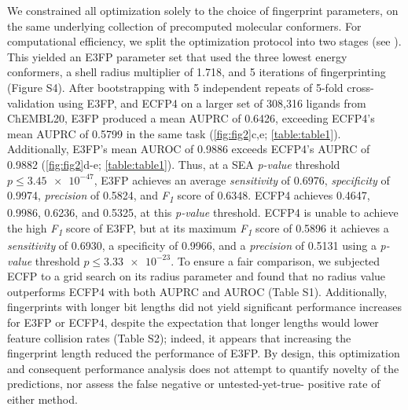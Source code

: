 \documentclass[../../main.tex]{subfiles}
\begin{document}
\begin{refsection}
	We constrained all optimization solely to the choice of fingerprint parameters, on the same underlying collection of precomputed molecular conformers.
	For computational efficiency, we split the optimization protocol into two stages (see ).
	This yielded an E3FP parameter set that used the three lowest energy conformers, a shell radius multiplier of 1.718, and 5 iterations of fingerprinting  (Figure S4).
	After bootstrapping with 5 independent repeats of 5-fold cross-validation using E3FP, and ECFP4 on a larger set of 308,316 ligands from ChEMBL20, E3FP produced a mean AUPRC of 0.6426, exceeding ECFP4's mean AUPRC of 0.5799 in the same task (\cref{fig:fig2}c,e; \cref{table:table1}).
	Additionally, E3FP's mean AUROC of 0.9886 exceeds ECFP4's AUPRC of 0.9882 (\cref{fig:fig2}d-e; \cref{table:table1}).
	Thus, at a SEA \emph{p-value} threshold  $p \le \num{3.45e-47}$, E3FP achieves an average \emph{sensitivity} of 0.6976, \emph{specificity} of 0.9974, \emph{precision} of 0.5824, and  \emph{F\textsubscript{1}} score of 0.6348.
	ECFP4 achieves 0.4647, 0.9986, 0.6236, and 0.5325, at this  \emph{p-value} threshold.
	ECFP4 is unable to achieve the high  \emph{F\textsubscript{1}} score of E3FP, but at its maximum  \emph{F\textsubscript{1}} score of 0.5896 it achieves a  \emph{sensitivity} of 0.6930, a specificity of 0.9966, and a  \emph{precision} of 0.5131 using a \emph{p-value} threshold $p \le \num{3.33e-23}$.
	To ensure a fair comparison, we subjected ECFP to a grid search on its radius parameter and found that no radius value outperforms ECFP4 with both AUPRC and AUROC (Table S1).
	Additionally, fingerprints with longer bit lengths did not yield significant performance increases for E3FP or ECFP4, despite the expectation that longer lengths would lower feature collision rates (Table S2); indeed, it appears that increasing the fingerprint length reduced the performance of E3FP.
	By design, this optimization and consequent performance analysis does not attempt to quantify novelty of the predictions, nor assess the false negative or untested-yet-true- positive rate of either method.


\end{refsection}
\end{document}
